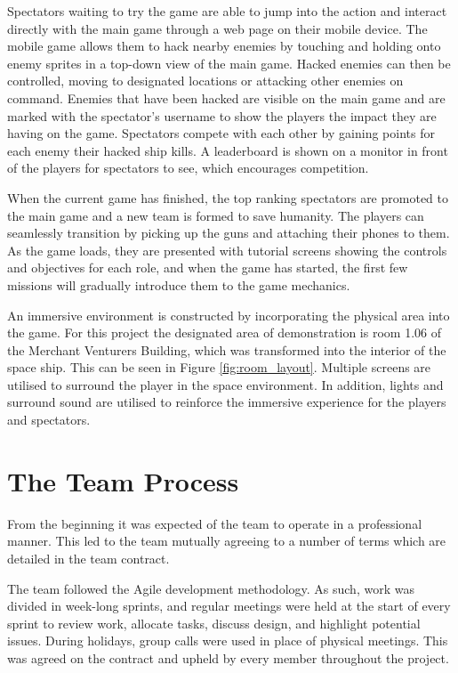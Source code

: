 \documentclass[a4paper,11pt]{article}
\begin{document}
Spectators waiting to try the game are able to jump into the action and interact directly with the main game through a web page on their mobile device. The mobile game allows them to hack nearby enemies by touching and holding onto enemy sprites in a top-down view of the main game. Hacked enemies can then be controlled, moving to designated locations or attacking other enemies on command. Enemies that have been hacked are visible on the main game and are marked with the spectator’s username to show the players the impact they are having on the game. Spectators compete with each other by gaining points for each enemy their hacked ship kills. A leaderboard is shown on a monitor in front of the players for spectators to see, which encourages competition. 

When the current game has finished, the top ranking spectators are promoted to the main game and a new team is formed to save humanity. The players can seamlessly transition by picking up the guns and attaching their phones to them. As the game loads, they are presented with tutorial screens showing the controls and objectives for each role, and when the game has started, the first few missions will gradually introduce them to the game mechanics.

An immersive environment is constructed by incorporating the physical area into the game. For this project the designated area of demonstration is room 1.06 of the  Merchant Venturers Building, which was transformed into the interior of the space ship. This can be seen in Figure \ref{fig:room_layout}. Multiple screens are utilised to surround the player in the space environment. In addition, lights and surround sound are utilised to reinforce the immersive experience for the players and spectators. 

\section{The Team Process}

From the beginning it was expected of the team to operate in a professional manner. This led to the team mutually agreeing to a number of terms which are detailed in the team contract.

The team followed the Agile development methodology. As such, work was divided in week-long sprints, and regular meetings were held at the start of every sprint to review work, allocate tasks, discuss design, and highlight potential issues. During holidays, group calls were used in place of physical meetings. This was agreed on the contract and upheld by every member throughout the project.
\end{document}
